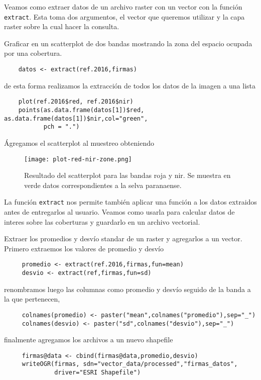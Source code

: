 Veamos como extraer datos de un archivo raster con un vector con la funci\'on
\texttt{extract}. Esta toma dos argumentos, el vector que queremos
utilizar y la capa raster sobre la cual hacer la consulta.

\begin{exa}
    Graficar en un scatterplot de dos bandas mostrando la zona del espacio
    ocupada por una cobertura.
    \begin{lstlisting}
    datos <- extract(ref.2016,firmas)
    \end{lstlisting}
    de esta forma realizamos la extracci\'on de todos los datos de la imagen a una
    lista
    \begin{lstlisting}
    plot(ref.2016$red, ref.2016$nir)
    points(as.data.frame(datos[1])$red, as.data.frame(datos[1])$nir,col="green",
           pch = ".")
    \end{lstlisting}
    Ágregamos el scatterplot al muestreo obteniendo
    \begin{figure}[h!]
    \begin{center}
        \texttt{[image: plot-red-nir-zone.png]}
    \end{center}
    \caption{Resultado del scatterplot para las bandas roja y nir. Se muestra en
        verde datos correspondientes a la selva paranaense.}
    \label{fig:rednirzone}
    \end{figure}

\end{exa}

La funci\'on \texttt{extract} nos permite tambi\'en aplicar una funci\'on a los datos
extraidos antes de entregarlos al usuario. Veamos como usarla para calcular
datos de interes sobre las coberturas y guardarlo en un archivo vectorial.

\begin{exa}
     Extraer los promedios y desv\'io standar de un raster y agregarlos a un
     vector. Primero extraemos los valores de promedio y desv\'io
     \begin{lstlisting}
     promedio <- extract(ref.2016,firmas,fun=mean)
     desvio <- extract(ref,firmas,fun=sd)
     \end{lstlisting}
     renombramos luego las columnas como promedio y desv\'io seguido de la banda a
     la que pertenecen,
     \begin{lstlisting}
     colnames(promedio) <- paster("mean",colnames("promedio"),sep="_")
     colnames(desvio) <- paster("sd",colnames("desvio"),sep="_")
     \end{lstlisting}
     finalmente agregamos los archivos a un nuevo shapefile
     \begin{lstlisting}
     firmas@data <- cbind(firmas@data,promedio,desvio)
     writeOGR(firmas, sdn="vector_data/processed","firmas_datos",
              driver="ESRI Shapefile")
     \end{lstlisting}
\end{exa}

